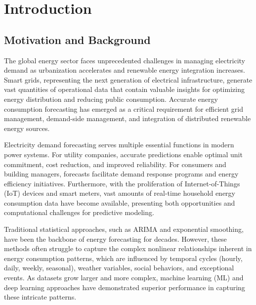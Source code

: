 
\section{Introduction}
\label{sec:intro}

\subsection{Motivation and Background}

The global energy sector faces unprecedented challenges in managing electricity demand as urbanization accelerates and renewable energy integration increases. Smart grids, representing the next generation of electrical infrastructure, generate vast quantities of operational data that contain valuable insights for optimizing energy distribution and reducing public consumption\cite{Fang2012SmartGrid}. Accurate energy consumption forecasting has emerged as a critical requirement for efficient grid management, demand-side management, and integration of distributed renewable energy sources\cite{Hippert2001NeuralNetworks}.

Electricity demand forecasting serves multiple essential functions in modern power systems. For utility companies, accurate predictions enable optimal unit commitment, cost reduction, and improved reliability\cite{Riedmiller1997}. For consumers and building managers, forecasts facilitate demand response programs and energy efficiency initiatives. Furthermore, with the proliferation of Internet-of-Things (IoT) devices and smart meters, vast amounts of real-time household energy consumption data have become available, presenting both opportunities and computational challenges for predictive modeling\cite{Kong2016LongTerm}.

Traditional statistical approaches, such as ARIMA and exponential smoothing, have been the backbone of energy forecasting for decades. However, these methods often struggle to capture the complex nonlinear relationships inherent in energy consumption patterns, which are influenced by temporal cycles (hourly, daily, weekly, seasonal), weather variables, social behaviors, and exceptional events\cite{Adhikari2013Comparing}. As datasets grow larger and more complex, machine learning (ML) and deep learning approaches have demonstrated superior performance in capturing these intricate patterns\cite{Alfares2008ElectricityLoad}.


